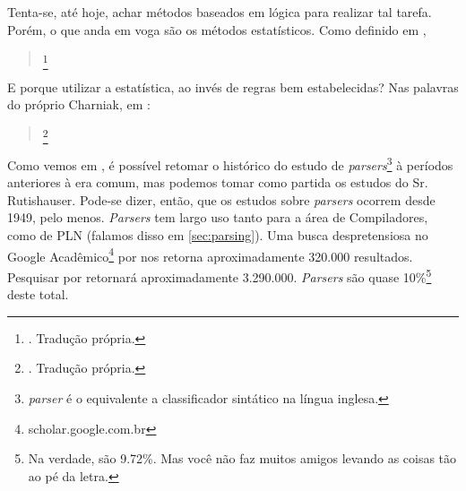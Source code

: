 Tenta-se, até hoje, achar métodos baseados em lógica para realizar tal tarefa. Porém, o que anda em voga são os métodos estatísticos. Como definido em ,
\begin{quote}
    \footnote{. Tradução própria.}
\end{quote}
E porque utilizar a estatística, ao invés de regras bem estabelecidas? Nas palavras do próprio Charniak, em :
\begin{quote}
    \footnote{. Tradução própria.}
\end{quote}
Como vemos em , é possível retomar o histórico do estudo de \textit{parsers}\footnote{\textit{\textit{parser}} é o equivalente a classificador sintático na língua inglesa.} à períodos anteriores à era comum,
mas podemos tomar como partida os estudos do Sr. Rutishauser. Pode-se dizer, então, que os estudos sobre \textit{parsers} ocorrem desde 1949, pelo menos.
\textit{Parsers} tem largo uso tanto para a área de Compiladores, como de PLN (falamos disso em \ref{sec:parsing}). Uma busca despretensiosa no Google Acadêmico\footnote{scholar.google.com.br} por  nos retorna aproximadamente 320.000 resultados. Pesquisar por  retornará aproximadamente 3.290.000. \textit{Parsers} são quase 10\%\footnote{Na verdade, são 9.72\%. Mas você não faz muitos amigos levando as coisas tão ao pé da letra.} deste total.

